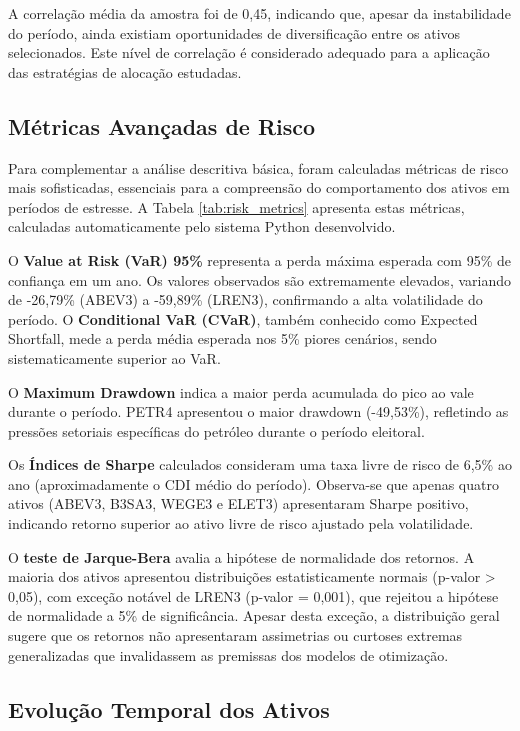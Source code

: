 A correlação média da amostra foi de 0,45, indicando que, apesar da instabilidade do período, ainda existiam oportunidades de diversificação entre os ativos selecionados. Este nível de correlação é considerado adequado para a aplicação das estratégias de alocação estudadas.

\subsection{Métricas Avançadas de Risco}

Para complementar a análise descritiva básica, foram calculadas métricas de risco mais sofisticadas, essenciais para a compreensão do comportamento dos ativos em períodos de estresse. A Tabela \ref{tab:risk_metrics} apresenta estas métricas, calculadas automaticamente pelo sistema Python desenvolvido.



O \textbf{Value at Risk (VaR) 95\%} representa a perda máxima esperada com 95\% de confiança em um ano. Os valores observados são extremamente elevados, variando de -26,79\% (ABEV3) a -59,89\% (LREN3), confirmando a alta volatilidade do período. O \textbf{Conditional VaR (CVaR)}, também conhecido como Expected Shortfall, mede a perda média esperada nos 5\% piores cenários, sendo sistematicamente superior ao VaR.

O \textbf{Maximum Drawdown} indica a maior perda acumulada do pico ao vale durante o período. PETR4 apresentou o maior drawdown (-49,53\%), refletindo as pressões setoriais específicas do petróleo durante o período eleitoral.

Os \textbf{Índices de Sharpe} calculados consideram uma taxa livre de risco de 6,5\% ao ano (aproximadamente o CDI médio do período). Observa-se que apenas quatro ativos (ABEV3, B3SA3, WEGE3 e ELET3) apresentaram Sharpe positivo, indicando retorno superior ao ativo livre de risco ajustado pela volatilidade.

O \textbf{teste de Jarque-Bera} avalia a hipótese de normalidade dos retornos. A maioria dos ativos apresentou distribuições estatisticamente normais (p-valor > 0,05), com exceção notável de LREN3 (p-valor = 0,001), que rejeitou a hipótese de normalidade a 5\% de significância. Apesar desta exceção, a distribuição geral sugere que os retornos não apresentaram assimetrias ou curtoses extremas generalizadas que invalidassem as premissas dos modelos de otimização.

\subsection{Evolução Temporal dos Ativos}


